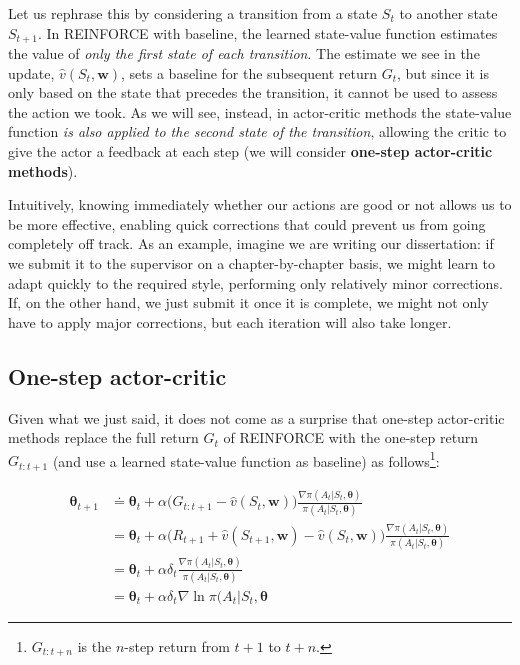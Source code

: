 Let us rephrase this by considering a transition from a state $S_t$ to another state $S_{t+1}$. In REINFORCE with baseline, the learned state-value function estimates the value of \textit{only the first state of each transition}. The estimate we see in the update, $\hat{v}(S_t,\boldsymbol{w})$, sets a baseline for the subsequent return $G_t$, but since it is only based on the state that precedes the transition, it cannot be used to assess the action we took. As we will see, instead, in actor-critic methods the state-value function \textit{is also applied to the second state of the transition}, allowing the critic to give the actor a feedback at each step (we will consider \textbf{one-step actor-critic methods}).

Intuitively, knowing immediately whether our actions are good or not allows us to be more effective, enabling quick corrections that could prevent us from going completely off track. As an example, imagine we are writing our dissertation: if we submit it to the supervisor on a chapter-by-chapter basis, we might learn to adapt quickly to the required style, performing only relatively minor corrections. If, on the other hand, we just submit it once it is complete, we might not only have to apply major corrections, but each iteration will also take longer.

\subsection{One-step actor-critic}
Given what we just said, it does not come as a surprise that one-step actor-critic methods replace the full return $G_t$ of REINFORCE with the one-step return $G_{t:t+1}$ (and use a learned state-value function as baseline) as follows\footnote{$G_{t:t+n}$ is the $n$-step return from $t+1$ to $t+n$.}:

\begin{equation}
    \begin{split}
        \boldsymbol{\theta}_{t+1} &\doteq \boldsymbol{\theta}_t + \alpha \big(G_{t:t+1} - \hat{v}(S_t,\boldsymbol{w}) \big) \frac{\nabla \pi (A_t \vert S_t, \boldsymbol{\theta})}{\pi (A_t \vert S_t, \boldsymbol{\theta})} \\
        &= \boldsymbol{\theta}_t + \alpha \big(R_{t+1} + \hat{v}(S_{t+1},\boldsymbol{w}) - \hat{v}(S_t,\boldsymbol{w}) \big) \frac{\nabla \pi (A_t \vert S_t, \boldsymbol{\theta})}{\pi (A_t \vert S_t, \boldsymbol{\theta})} \\
        &= \boldsymbol{\theta}_t + \alpha \delta_t \frac{\nabla \pi (A_t \vert S_t, \boldsymbol{\theta})}{\pi (A_t \vert S_t, \boldsymbol{\theta})} \\
        &= \boldsymbol{\theta}_t + \alpha \delta_t \nabla \ln{\pi (A_t \vert S_t, \boldsymbol{\theta}}
    \end{split}
    \label{eq:ch8-onestepactorcriticupdaterule}
\end{equation}

